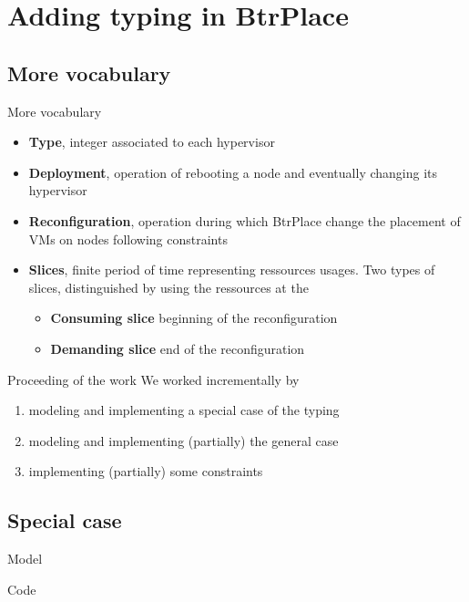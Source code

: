 \documentclass{beamer}
\begin{document}
\section{Adding typing in BtrPlace}
\subsection{More vocabulary}
\begin{frame}{More vocabulary}
\begin{itemize}
	\item{\textbf{Type}}, integer associated to each hypervisor
	\item{\textbf{Deployment}}, operation of rebooting a node and
		eventually changing its hypervisor
	\item{\textbf{Reconfiguration}}, operation during which BtrPlace
		change the placement of VMs on nodes following constraints
	\item{\textbf{Slices}}, finite period of time representing
		ressources usages. Two types of slices, distinguished by
		using the ressources at the
		\begin{itemize}
			\item{\textbf{Consuming slice}} beginning of the
				reconfiguration
			\item{\textbf{Demanding slice}} end of the reconfiguration
		\end{itemize}
\end{itemize}
\end{frame}
\begin{frame}{Proceeding of the work}
We worked incrementally by
\begin{enumerate}
	 \item modeling and implementing a special case of the typing
	 \item modeling and implementing (partially) the general case
	 \item implementing (partially) some constraints
\end{enumerate}
\end{frame}

\subsection{Special case}
\begin{frame}{Model}
\end{frame}
\begin{frame}{Code}
\end{frame}
\end{document}
